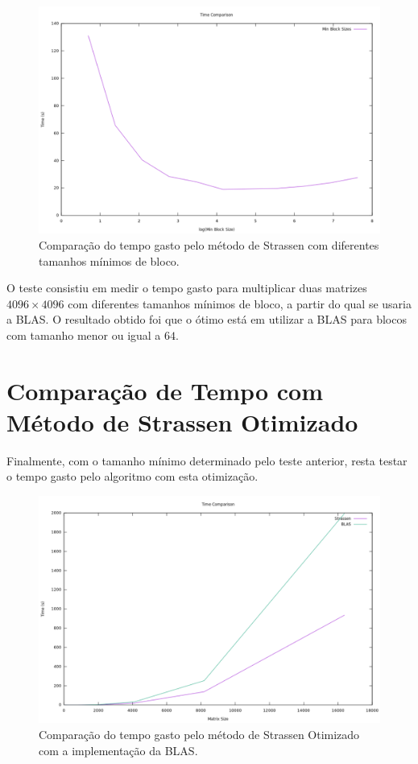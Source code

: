\documentclass[12pt,a4paper,onecolumn]{article}
\begin{document}
\begin{figure}[H]
\centering
\includegraphics[width=1\linewidth]
{./figures/plot_block_test.pdf}
\caption{Comparação do tempo gasto pelo método de Strassen com diferentes tamanhos mínimos de bloco.} 
\label{block_test}
\end{figure}

O teste consistiu em medir o tempo gasto para multiplicar duas matrizes $4096 \times 4096$ com diferentes tamanhos
mínimos de bloco, a partir do qual se usaria a BLAS. O resultado obtido foi que o ótimo está em utilizar a BLAS para blocos com tamanho 
menor ou igual a $64$.



\section*{Comparação de Tempo com Método de Strassen Otimizado}

Finalmente, com o tamanho mínimo determinado pelo teste anterior, resta testar o tempo gasto pelo algoritmo com esta otimização.

\begin{figure}[H]
\centering
\includegraphics[width=1\linewidth]
{./figures/plot_time.pdf}
\caption{Comparação do tempo gasto pelo método de Strassen Otimizado com a implementação da BLAS.} 
\label{opt_time}
\end{figure}
\end{document}
